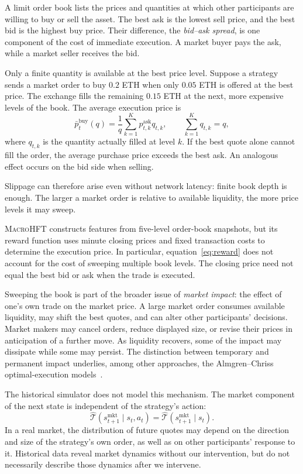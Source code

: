 \documentclass[9pt,a4paper,twocolumn]{extarticle}
\newcommand{\Macro}{\textsc{MacroHFT}}
\begin{document}
A limit order book lists the prices and quantities at which other participants are willing to
buy or sell the asset. The best ask is the lowest sell price, and the best bid is the highest buy
price. Their difference, the \emph{bid--ask spread}, is one component of the cost of immediate
execution. A market buyer pays the ask, while a market seller receives the bid.

Only a finite quantity is available at the best price level. Suppose a strategy sends a market
order to buy $0.2$ ETH when only $0.05$ ETH is offered at the best price. The exchange fills the
remaining $0.15$ ETH at the next, more expensive levels of the book. The average execution price
is
\begin{equation}
    \bar p_t^{\mathrm{buy}}(q)
    =
    \frac{1}{q}
    \sum_{k=1}^{K}
       p_{t,k}^{\mathrm{ask}}q_{t,k},
    \qquad
    \sum_{k=1}^{K}q_{t,k}=q,
    \label{eq:lob_sweep}
\end{equation}
where $q_{t,k}$ is the quantity actually filled at level $k$. If the best quote alone cannot fill
the order, the average purchase price exceeds the best ask. An analogous effect occurs on the
bid side when selling.

Slippage can therefore arise even without network latency: finite book depth is enough. The
larger a market order is relative to available liquidity, the more price levels it may sweep.

\Macro{} constructs features from five-level order-book snapshots, but its reward function uses
minute closing prices and fixed transaction costs to determine the execution price. In
particular, equation~\eqref{eq:reward} does not account for the cost of sweeping multiple book
levels. The closing price need not equal the best bid or ask when the trade is executed.

Sweeping the book is part of the broader issue of \emph{market impact}: the effect of one's own
trade on the market price. A large market order consumes available liquidity, may shift the best
quotes, and can alter other participants' decisions. Market makers may cancel orders, reduce
displayed size, or revise their prices in anticipation of a further move. As liquidity recovers,
some of the impact may dissipate while some may persist. The distinction between temporary and
permanent impact underlies, among other approaches, the Almgren--Chriss optimal-execution
models~\cite{almgren2001optimal}.

The historical simulator does not model this mechanism. The market component of the next state
is independent of the strategy's action:
\begin{equation}
    \widehat{\mathcal T}
    (s_{t+1}^{\mathrm{mkt}}\mid s_t,a_t)
    =
    \widehat{\mathcal T}
    (s_{t+1}^{\mathrm{mkt}}\mid s_t).
    \label{eq:exogenous_market}
\end{equation}
In a real market, the distribution of future quotes may depend on the direction and size of the
strategy's own order, as well as on other participants' response to it. Historical data reveal
market dynamics without our intervention, but do not necessarily describe those dynamics after
we intervene.
\end{document}
